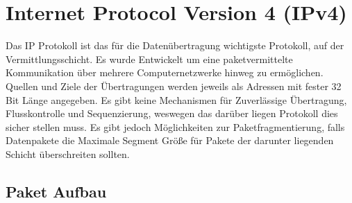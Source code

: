 \section{Internet Protocol Version 4 (IPv4)}
Das IP Protokoll ist das für die Datenübertragung wichtigste Protokoll, auf der Vermittlungsschicht. Es wurde Entwickelt um eine paketvermittelte Kommunikation über mehrere Computernetzwerke hinweg zu ermöglichen. Quellen und Ziele der Übertragungen werden jeweils als Adressen mit fester 32 Bit Länge angegeben. Es gibt keine Mechanismen für Zuverlässige Übertragung, Flusskontrolle und Sequenzierung, weswegen das darüber liegen Protokoll dies sicher stellen muss. Es gibt jedoch Möglichkeiten zur Paketfragmentierung, falls Datenpakete die Maximale Segment Größe für Pakete der darunter liegenden Schicht überschreiten sollten.

\subsection{Paket Aufbau}

